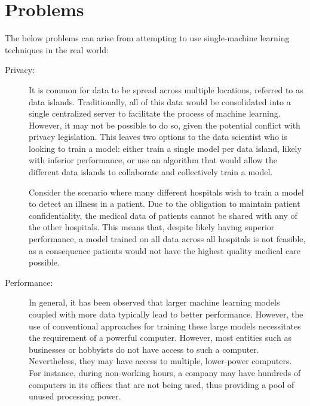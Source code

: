 \section{Problems} \label{problems}
The below problems can arise from attempting to use single-machine learning techniques in the real world:
\begin{description}
	\item[Privacy:] It is common for data to be spread across multiple locations, referred to as data islands. Traditionally, all of this data would be consolidated into a single centralized server to facilitate the process of machine learning. However, it may not be possible to do so, given the potential conflict with privacy legislation. This leaves two options to the data scientist who is looking to train a model: either train a single model per data island, likely with inferior performance, or use an algorithm that would allow the different data islands to collaborate and collectively train a model.
	
	Consider the scenario where many different hospitals wish to train a model to detect an illness in a patient. Due to the obligation to maintain patient confidentiality, the medical data of patients cannot be shared with any of the other hospitals. This means that, despite likely having superior performance, a model trained on all data across all hospitals is not feasible, as a consequence patients would not have the highest quality medical care possible.
	
	\item[Performance:] In general, it has been observed that larger machine learning models coupled with more data typically lead to better performance. However, the use of conventional approaches for training these large models necessitates the requirement of a powerful computer. However, most entities such as businesses or hobbyists do not have access to such a computer. Nevertheless, they may have access to multiple, lower-power computers. For instance, during non-working hours, a company may have hundreds of computers in its offices that are not being used, thus providing a pool of unused processing power.
\end{description}

